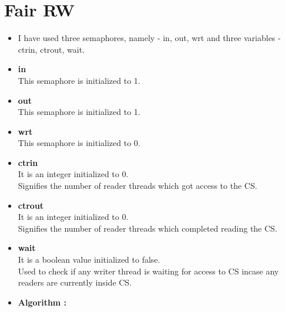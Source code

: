 \documentclass[12pt]{article}
\begin{document}
\section{Fair RW}
\begin{itemize}
\item I have used three semaphores, namely - in, out, wrt and three variables - ctrin, ctrout, wait.
\item \textbf{in}\\
This semaphore is initialized to 1.\\
\item \textbf{out}\\
This semaphore is initialized to 1.\\
\item \textbf{wrt}\\
This semaphore is initialized to 0.\\
\item \textbf{ctrin}\\
It is an integer initialized to 0.\\
Signifies the number of reader threads which got access to the CS.\\
\item \textbf{ctrout}\\
It is an integer initialized to 0.\\
Signifies the number of reader threads which completed reading the CS.\\
\item \textbf{wait}\\
It is a boolean value initialized to false.\\
Used to check if any writer thread is waiting for access to CS incase any readers are currently inside CS.
\item \textbf{Algorithm :}\\\\


\end{itemize}
\end{document}
